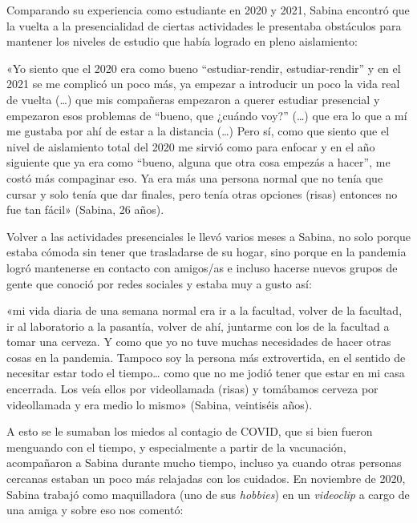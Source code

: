 \begin{refsection}
\begin{gbcita}
\end{gbcita}

Comparando su experiencia como estudiante en 2020 y 2021, Sabina encontró que la vuelta a la presencialidad de ciertas actividades le presentaba obstáculos para mantener los niveles de estudio que había logrado en pleno aislamiento:


\begin{gbcita}
«Yo siento que el 2020 era como bueno “estudiar-rendir, estudiar-rendir” y en el 2021 se me complicó un poco más, ya empezar a introducir un poco la vida real de vuelta (…) que mis compañeras empezaron a querer estudiar presencial y empezaron esos problemas de “bueno, que ¿cuándo voy?” (…) que era lo que a mí me gustaba por ahí de estar a la distancia (…) Pero sí, como que siento que el nivel de aislamiento total del 2020 me sirvió como para enfocar y en el año siguiente que ya era como “bueno, alguna que otra cosa empezás a hacer”, me costó más compaginar eso. Ya era más una persona normal que no tenía que cursar y solo tenía que dar finales, pero tenía otras opciones (risas) entonces no fue tan fácil» (Sabina, 26 años).

\end{gbcita}

Volver a las actividades presenciales le llevó varios meses a Sabina, no solo porque estaba cómoda sin tener que trasladarse de su hogar, sino porque en la pandemia logró mantenerse en contacto con amigos/as e incluso hacerse nuevos grupos de gente que conoció por redes sociales y estaba muy a gusto así:


\begin{gbcita}
«mi vida diaria de una semana normal era ir a la facultad, volver de la facultad, ir al laboratorio a la pasantía, volver de ahí, juntarme con los de la facultad a tomar una cerveza. Y como que yo no tuve muchas necesidades de hacer otras cosas en la pandemia. Tampoco soy la persona más extrovertida, en el sentido de necesitar estar todo el tiempo… como que no me jodió tener que estar en mi casa encerrada. Los veía ellos por videollamada (risas) y tomábamos cerveza por videollamada y era medio lo mismo» (Sabina, veintiséis años).

\end{gbcita}

A esto se le sumaban los miedos al contagio de COVID, que si bien fueron menguando con el tiempo, y especialmente a partir de la vacunación, acompañaron a Sabina durante mucho tiempo, incluso ya cuando otras personas cercanas estaban un poco más relajadas con los cuidados. En noviembre de 2020, Sabina trabajó como maquilladora (uno de sus \emph{hobbies}) en un \emph{videoclip} a cargo de una amiga y sobre eso nos comentó:



\end{refsection}

